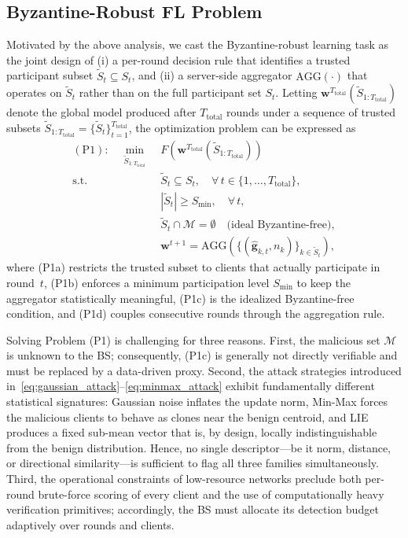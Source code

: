 \documentclass[journal]{IEEEtran}
\begin{document}
\subsection{Byzantine-Robust FL Problem}
\label{sec:p1}

Motivated by the above analysis, we cast the Byzantine-robust learning task as the joint design of (i) a per-round decision rule that identifies a trusted participant subset $\widetilde{S}_t \subseteq S_t$, and (ii) a server-side aggregator $\text{AGG}(\cdot)$ that operates on $\widetilde{S}_t$ rather than on the full participant set $S_t$. Letting $\mathbf{w}^{T_{\text{total}}}(\widetilde{S}_{1:T_{\text{total}}})$ denote the global model produced after $T_{\text{total}}$ rounds under a sequence of trusted subsets $\widetilde{S}_{1:T_{\text{total}}}=\{\widetilde{S}_t\}_{t=1}^{T_{\text{total}}}$, the optimization problem can be expressed as
\begin{subequations}\label{eq:p1}
\begin{align}
(\mathrm{P1}):\quad\min_{\widetilde{S}_{1:T_{\text{total}}}}\;& F\!\left(\mathbf{w}^{T_{\text{total}}}(\widetilde{S}_{1:T_{\text{total}}})\right) \label{eq:p1_obj}\\
\text{s.t.}\quad &\widetilde{S}_t \subseteq S_t,\quad \forall\,t\in\{1,\dots,T_{\text{total}}\}, \tag{P1a}\\
&|\widetilde{S}_t| \ge S_{\min},\quad \forall\,t, \tag{P1b}\\
&\widetilde{S}_t \cap \mathcal{M} = \emptyset \quad \text{(ideal Byzantine-free)}, \tag{P1c}\\
&\mathbf{w}^{t+1}=\text{AGG}\!\left(\{(\hat{\mathbf{g}}_{k,t},n_k)\}_{k\in\widetilde{S}_t}\right),\tag{P1d}
\end{align}
\end{subequations}
where (P1a) restricts the trusted subset to clients that actually participate in round~$t$, (P1b) enforces a minimum participation level $S_{\min}$ to keep the aggregator statistically meaningful, (P1c) is the idealized Byzantine-free condition, and (P1d) couples consecutive rounds through the aggregation rule.

Solving Problem (P1) is challenging for three reasons. First, the malicious set $\mathcal{M}$ is unknown to the BS; consequently, (P1c) is generally not directly verifiable and must be replaced by a data-driven proxy. Second, the attack strategies introduced in~\eqref{eq:gaussian_attack}--\eqref{eq:minmax_attack} exhibit fundamentally different statistical signatures: Gaussian noise inflates the update norm, Min-Max forces the malicious clients to behave as clones near the benign centroid, and LIE produces a fixed sub-mean vector that is, by design, locally indistinguishable from the benign distribution. Hence, no single descriptor—be it norm, distance, or directional similarity—is sufficient to flag all three families simultaneously. Third, the operational constraints of low-resource networks preclude both per-round brute-force scoring of every client and the use of computationally heavy verification primitives; accordingly, the BS must allocate its detection budget adaptively over rounds and clients.
\end{document}
